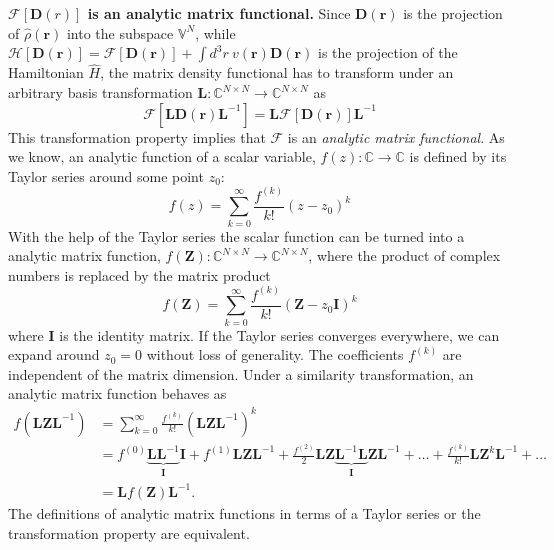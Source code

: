 \documentclass[journal=jpclcd,manuscript=letter]{achemso}
\newcommand\m[1]{\mathbf{#1}}
\renewcommand\vec[1]{\mathbf{#1}}
\begin{document}
\textbf{$\mathcal{F}[\m{D}(r)]$ is an analytic matrix functional.}
Since $\m{D}(\vec{r})$ is the projection of $\hat{\rho}(\vec{r})$ into the subspace $\mathbb{V}^{N}$, while ${\mathcal{H}[\m{D}(\vec{r})] = \mathcal{F}[\m{D}(\vec{r})] + \int d^3r ~ v(\vec{r}) \m{D}(\vec{r})}$ is the projection of the Hamiltonian $\hat{H}$, the matrix density functional has to transform under an arbitrary basis transformation $\m{L} : \mathbb{C}^{N \times N} \to \mathbb{C}^{N \times N}$ as \cite{Lu2022JPCL}
\begin{equation}
\mathcal{F}[\m{L} \m{D}(\vec{r}) \m{L}^{-1}] = \m{L} \mathcal{F}[\mathbf{D}(\vec{r})] \mathbf{L}^{-1} \label{eqn:basis_transformation_symmetry}
\end{equation}
This transformation property implies that $\mathcal{F}$ is an \emph{analytic matrix functional}. As we know, an analytic function of a scalar variable, $f(z): \mathbb{C} \to \mathbb{C}$ is defined by its Taylor series around some point $z_0$:
\begin{equation}
f(z) = \sum_{k=0}^{\infty} \frac{f^{(k)}}{k!} (z-z_0)^k
\end{equation}
With the help of the Taylor series the scalar function can be turned into a analytic matrix function, $f(\m{Z}): \mathbb{C}^{N \times N} \to \mathbb{C}^{N \times N}$, where the product of complex numbers is replaced by the matrix product
\begin{equation}
f(\m{Z}) = \sum_{k=0}^{\infty} \frac{f^{(k)}}{k!} (\m{Z} - z_0 \m{I})^k
\end{equation}
where $\m{I}$ is the identity matrix. If the Taylor series converges everywhere, we can expand around $z_0 = 0$ without loss of generality.
The coefficients $f^{(k)}$ are independent of the matrix dimension. Under a similarity transformation, an analytic matrix function behaves as
\begin{equation}
\begin{split}
  f(\m{L} \m{Z} \m{L}^{-1}) &= \sum_{k=0}^{\infty} \frac{f^{(k)}}{k!} (\m{L} \m{Z} \m{L}^{-1})^k \\
  &= f^{(0)} \underbrace{\m{L} \m{L}^{-1}}_{\m{I}} \m{I}
  + f^{(1)} \m{L} \m{Z} \m{L}^{-1}
  + \frac{f^{(2)}}{2} \m{L} \m{Z} \underbrace{\m{L}^{-1} \m{L}}_{\m{I}} \m{Z} \m{L}^{-1}
  + \ldots
  + \frac{f^{(k)}}{k!} \m{L} \m{Z}^k \m{L}^{-1} + \ldots \\
  &= \m{L} f(\m{Z}) \m{L}^{-1}.
\end{split}
\end{equation}
The definitions of analytic matrix functions in terms of a Taylor series or the transformation property are equivalent. \cite{Rinehart1955} 
\end{document}
